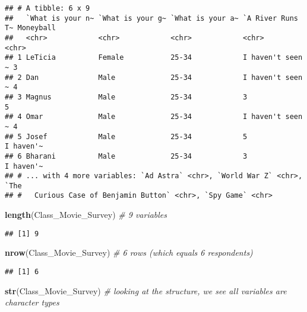 \documentclass[]{article}
\newenvironment{Shaded}{\begin{snugshade}}{\end{snugshade}}
\newcommand{\CommentTok}[1]{\textcolor[rgb]{0.56,0.35,0.01}{\textit{#1}}}
\newcommand{\KeywordTok}[1]{\textcolor[rgb]{0.13,0.29,0.53}{\textbf{#1}}}
\newcommand{\NormalTok}[1]{#1}
\begin{document}
\begin{verbatim}
## # A tibble: 6 x 9
##   `What is your n~ `What is your g~ `What is your a~ `A River Runs T~ Moneyball
##   <chr>            <chr>            <chr>            <chr>            <chr>    
## 1 LeTicia          Female           25-34            I haven't seen ~ 3        
## 2 Dan              Male             25-34            I haven't seen ~ 4        
## 3 Magnus           Male             25-34            3                5        
## 4 Omar             Male             25-34            I haven't seen ~ 4        
## 5 Josef            Male             25-34            5                I haven'~
## 6 Bharani          Male             25-34            3                I haven'~
## # ... with 4 more variables: `Ad Astra` <chr>, `World War Z` <chr>, `The
## #   Curious Case of Benjamin Button` <chr>, `Spy Game` <chr>
\end{verbatim}

\begin{Shaded}
\begin{Highlighting}[]
\KeywordTok{length}\NormalTok{(Class_Movie_Survey) }\CommentTok{# 9 variables}
\end{Highlighting}
\end{Shaded}

\begin{verbatim}
## [1] 9
\end{verbatim}

\begin{Shaded}
\begin{Highlighting}[]
\KeywordTok{nrow}\NormalTok{(Class_Movie_Survey) }\CommentTok{# 6 rows (which equals 6 respondents)}
\end{Highlighting}
\end{Shaded}

\begin{verbatim}
## [1] 6
\end{verbatim}

\begin{Shaded}
\begin{Highlighting}[]
\KeywordTok{str}\NormalTok{(Class_Movie_Survey) }\CommentTok{# looking at the structure, we see all variables are character types}
\end{Highlighting}
\end{Shaded}
\end{document}
